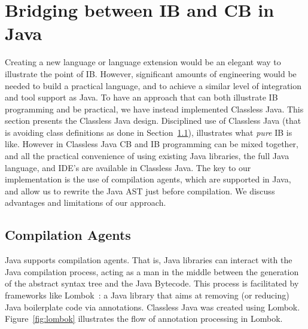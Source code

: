 \section{Bridging between IB and CB in Java}\label{sec:imp}


Creating a new language or language extension would be an
elegant way to illustrate the point of IB. However,
significant amounts of engineering would be needed to build a practical
language, and to achieve a similar level of integration and tool support
as Java. To have an approach that can both illustrate IB
programming and be practical, we have instead implemented Classless Java.
This section presents the Classless Java design.
Disciplined use of Classless Java (that is avoiding class
definitions as done in Section~\ref{}), illustrates what \emph{pure} IB is like.
However in Classless Java CB and IB programming can be mixed together, and all
the practical convenience of using existing Java libraries, the full
Java language, and IDE's are available in Classless Java.
The key to our implementation is the use of compilation agents, which
are supported in Java, and allow us to rewrite the Java AST just
before compilation. We discuss advantages and limitations of our approach.

\subsection{Compilation Agents}
Java supports compilation agents\cite{compilationagents}.
That is, Java libraries can interact with the Java compilation process,
acting as a man in the middle between the
generation of the abstract syntax tree and the Java Bytecode.
This process is facilitated by frameworks like Lombok~\cite{lombok}:
a Java library that aims at removing (or
reducing) Java boilerplate code via
annotations. Classless Java was created using Lombok.
Figure~\ref{fig:lombok} illustrates the
flow of \mixin annotation processing in Lombok.

